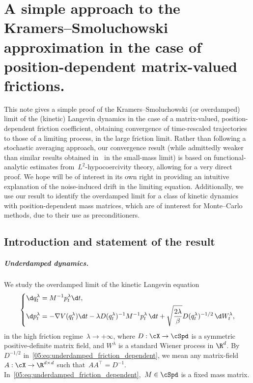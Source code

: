 \chapter{A simple approach to the Kramers--Smoluchowski approximation in the case of position-dependent matrix-valued frictions.}
\label{chap:overdamped}

\begin{chapterabstract}
    This note gives a simple proof of the Kramers--Smoluchowski (or overdamped) limit of the (kinetic) Langevin dynamics in the case of a matrix-valued, position-dependent friction coefficient,
    obtaining convergence of time-rescaled trajectories to those of a limiting process, in the large friction limit.
    Rather than following a stochastic averaging approach, our convergence result (while admittedly weaker than similar results obtained in~\cite{HMVW15} in the small-mass limit) is based on functional-analytic estimates from~$L^2$-hypocoercivity theory, allowing for a very direct proof.
    We hope will be of interest in its own right in providing an intuitive explanation of the noise-induced drift in the limiting equation.
    Additionally, we use our result to identify the overdamped limit for a class of kinetic dynamics with position-dependent mass matrices, which are of innterest for Monte--Carlo methods, due to their use as preconditioners.
\end{chapterabstract}

\section{Introduction and statement of the result}
\label{05:sec:intro}

\paragraph{Underdamped dynamics.}
We study the overdamped limit of the kinetic Langevin equation
\begin{equation}
    \label{05:eq:underdamped_friction_dependent}
    \left\{
    \begin{aligned}
            \d q_t^\lambda &= M^{-1}p_t^\lambda \d t,\\
            \d p_t^\lambda &= -\nabla V(q_t^\lambda) \d t - \lambda D(q_t^\lambda)^{-1}M^{-1}p_t^\lambda\,\d t + \sqrt{\frac{2\lambda}{\beta}}D(q_t^\lambda)^{-1/2}\,\d W_t^\lambda,
        \end{aligned}
    \right.
\end{equation}
in the high friction regime~$\lambda\to+\infty$, where $D:\cX\to \cSpd$ is a symmetric positive-definite matrix field, and $W^\lambda$ is a standard Wiener process in $\R^d$. By~$D^{-1/2}$ in~\eqref{05:eq:underdamped_friction_dependent}, we mean any matrix-field $A:\cX\to\R^{d\times d}$ such that~$AA^\top=D^{-1}$. In~\eqref{05:eq:underdamped_friction_dependent},~$M\in \cSpd$ is a fixed mass matrix.

